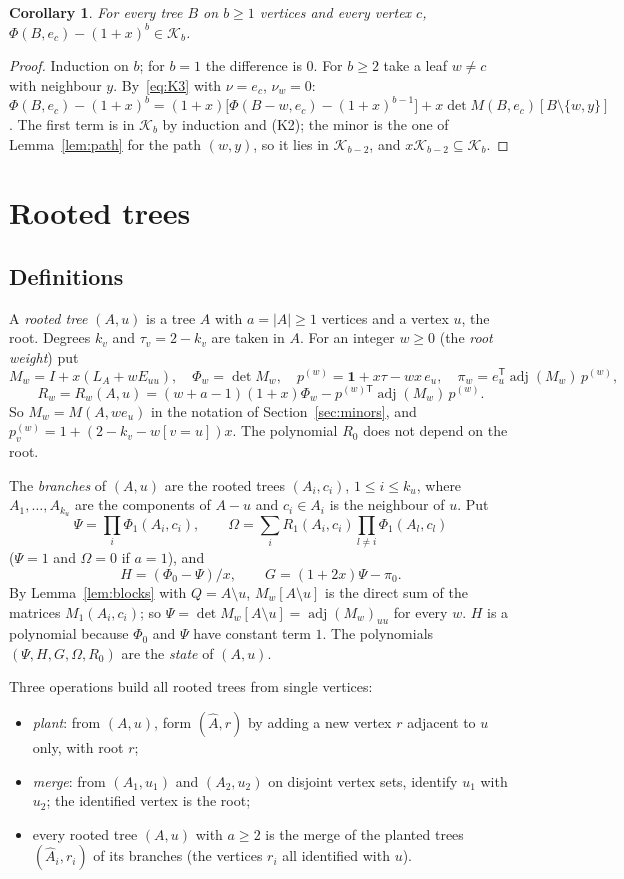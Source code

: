 \documentclass[11pt]{amsart}
\newtheorem{corollary}[theorem]{Corollary}
\theoremstyle{definition}
\theoremstyle{remark}
\newcommand{\adj}{\operatorname{adj}}
\newcommand{\K}{\mathcal K}
\newcommand{\one}{\mathbf 1}
\newcommand{\T}{\mathsf T}
\begin{document}
\begin{corollary}\label{cor:phi1}
For every tree $B$ on $b\ge1$ vertices and every vertex $c$,
$\Phi(B,e_c)-(1+x)^b\in\K_b$.
\end{corollary}

\begin{proof}
Induction on $b$; for $b=1$ the difference is $0$. For $b\ge2$ take a leaf
$w\ne c$ with neighbour $y$. By~\eqref{eq:K3} with $\nu=e_c$, $\nu_w=0$:
$\Phi(B,e_c)-(1+x)^b=(1+x)\bigl[\Phi(B-w,e_c)-(1+x)^{b-1}\bigr]+x\det M(B,e_c)[B\setminus\{w,y\}]$.
The first term is in $\K_b$ by induction and (K2); the minor is the one of
Lemma~\ref{lem:path} for the path $(w,y)$, so it lies in $\K_{b-2}$, and
$x\K_{b-2}\subseteq\K_b$.
\end{proof}

\section{Rooted trees}\label{sec:rooted}

\subsection{Definitions}
A \emph{rooted tree} $(A,u)$ is a tree $A$ with $a=|A|\ge1$ vertices and a
vertex $u$, the root. Degrees $k_v$ and $\tau_v=2-k_v$ are taken in $A$. For
an integer $w\ge0$ (the \emph{root weight}) put
\[
M_w=I+x(L_A+wE_{uu}),\quad \Phi_w=\det M_w,\quad p^{(w)}=\one+x\tau-wx\,e_u,\quad
\pi_w=e_u^\T\adj(M_w)\,p^{(w)},
\]
\[
R_w=R_w(A,u)=(w+a-1)(1+x)\Phi_w-p^{(w)\T}\adj(M_w)\,p^{(w)} .
\]
So $M_w=M(A,we_u)$ in the notation of Section~\ref{sec:minors}, and
$p^{(w)}_v=1+(2-k_v-w[v=u])x$. The polynomial $R_0$ does not depend on the
root.

The \emph{branches} of $(A,u)$ are the rooted trees $(A_i,c_i)$,
$1\le i\le k_u$, where $A_1,\dots,A_{k_u}$ are the components of $A-u$ and
$c_i\in A_i$ is the neighbour of $u$. Put
\[
\Psi=\prod_i\Phi_1(A_i,c_i),\qquad
\Omega=\sum_iR_1(A_i,c_i)\prod_{l\ne i}\Phi_1(A_l,c_l)
\]
($\Psi=1$ and $\Omega=0$ if $a=1$), and
\[
H=(\Phi_0-\Psi)/x,\qquad G=(1+2x)\Psi-\pi_0 .
\]
By Lemma~\ref{lem:blocks} with $Q=A\setminus u$, $M_w[A\setminus u]$ is the
direct sum of the matrices $M_1(A_i,c_i)$; so $\Psi=\det M_w[A\setminus u]=\adj(M_w)_{uu}$
for every $w$. $H$ is a polynomial because $\Phi_0$ and $\Psi$ have constant
term $1$. The polynomials $(\Psi,H,G,\Omega,R_0)$ are the \emph{state} of
$(A,u)$.

Three operations build all rooted trees from single vertices:
\begin{itemize}
\item \emph{plant}: from $(A,u)$, form $(\hat A,r)$ by adding a new vertex $r$
adjacent to $u$ only, with root $r$;
\item \emph{merge}: from $(A_1,u_1)$ and $(A_2,u_2)$ on disjoint vertex sets,
identify $u_1$ with $u_2$; the identified vertex is the root;
\item every rooted tree $(A,u)$ with $a\ge2$ is the merge of the planted
trees $(\hat A_i,r_i)$ of its branches (the vertices $r_i$ all identified
with $u$).
\end{itemize}
\end{document}
